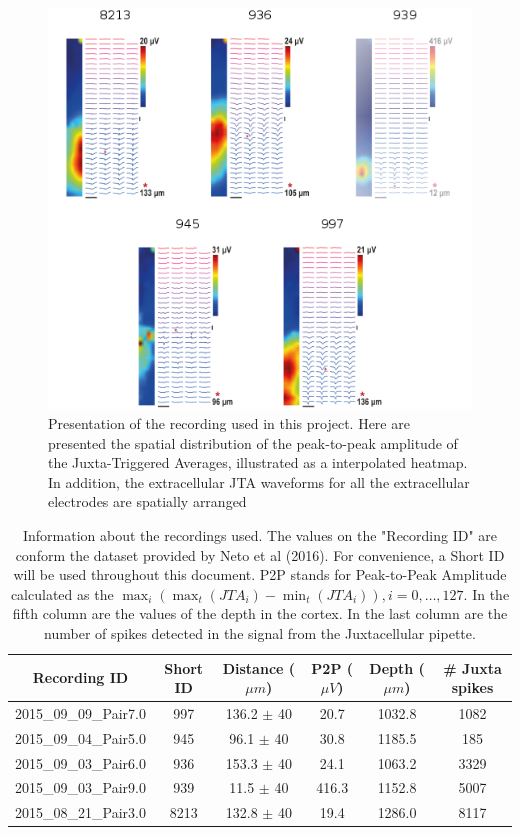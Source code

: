 \documentclass{report}
\begin{document}
\begin{figure}[!h]
	\centering
	\includegraphics[width=\textwidth]{dataset-JTA.png}
	\caption{Presentation of the recording used in this project. Here are presented the spatial distribution of the peak-to-peak amplitude of the Juxta-Triggered Averages, illustrated as a interpolated heatmap. In addition, the extracellular JTA waveforms for all the extracellular electrodes are spatially arranged
}
\label{fig:recordings-summary}
\end{figure}


\begin{table}[!h]
\centering
\begin{tabular}{|c|c|c|c|c|c|}
\hline
\textbf{Recording ID} & \textbf{Short ID} & \textbf{Distance ($\mu m$) } & \textbf{P2P ($\mu V$)} & \textbf{Depth ($\mu m$)} & \textbf{\# Juxta spikes}\\ \hline
2015\_09\_09\_Pair7.0 & 997 & 136.2 $\pm$ 40 & 20.7 & 1032.8 & 1082  \\ \hline
2015\_09\_04\_Pair5.0 & 945 & 96.1 $\pm$ 40 & 30.8 & 1185.5 & 185  \\ \hline
2015\_09\_03\_Pair6.0 & 936 & 153.3 $\pm$  40 & 24.1 & 1063.2 & 3329 \\ \hline
2015\_09\_03\_Pair9.0 & 939 & 11.5 $\pm$  40 & 416.3 & 1152.8 & 5007  \\ \hline
2015\_08\_21\_Pair3.0 & 8213 & 132.8 $\pm$ 40 & 19.4 & 1286.0 & 8117 \\ \hline
\end{tabular}
\caption{Information about the recordings used. The values on the "Recording ID" are conform the dataset provided by Neto et al (2016). For convenience, a Short ID will be used throughout this document. P2P stands for Peak-to-Peak Amplitude calculated as the $\max_i \left( \max_t \left( JTA_i \right) - \min_t \left( JTA_i \right)\right), i=0,\ldots , 127$. In the fifth column are the values of the depth in the cortex. In the last column are the number of spikes detected in the signal from the Juxtacellular pipette.}
\label{tab:sum-recordings}
\end{table}
\end{document}
